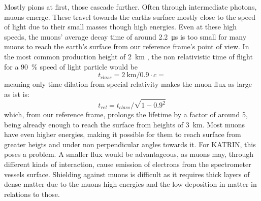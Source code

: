     Mostly pions at first, those cascade further. Often through intermediate photons, muons emerge. These travel towards the earths surface mostly close to the speed of light due to their small masses though high energies. Even at these high speeds, the muons' average decay time of around \SI{2.2}{\micro\second} \cite{muonLifetime} is too small for many muons to reach the earth's surface from our reference frame's point of view. In the most common production height of \SI{2}{\kilo\meter} \cite{muonProductionHeight}, the non relativistic time of flight for a \SI{90}{\percent} speed of light particle would be
    \begin{equation}
	t_{class} = \SI{2}{\kilo\meter} / 0.9\cdot c = 
    \end{equation}
    meaning only time dilation from special relativity makes the muon flux as large as ist is:
    \begin{equation}
    	t_{rel} = t_{class} / \sqrt{1-0.9^2}
    \end{equation}
    which, from our reference frame, prolongs the lifetime by a factor of around 5, being already enough to reach the surface from heights of \SI{3}{\kilo\meter}. Most muons have even higher energies, making it possible for them to reach surface from greater heigts and under non perpendicular angles towards it.
    For KATRIN, this poses a problem. A smaller flux would be advantageous, as muons may, through different kinds of interaction, cause emission of electrons from the spectrometer vessels surface. Shielding against muons is difficult as it requires thick layers of dense matter due to the muons high energies and the low deposition in matter in relations to those. 
    

    
   